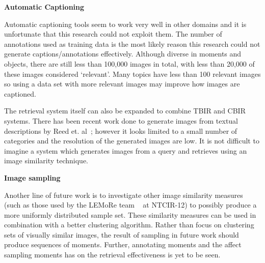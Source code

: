 \textbf{Automatic Captioning}

Automatic captioning tools seem to work very well in other domains and it is unfortunate that this research could not exploit them. The number of annotations used as training data is the most likely reason this research could not generate captions/annotations effectively. Although diverse in moments and objects, there are still less than 100,000 images in total, with less than 20,000 of these images considered `relevant'. Many topics have less than 100 relevant images so using a data set with more relevant images may improve how images are captioned. 

The retrieval system itself can also be expanded to combine TBIR and CBIR systems. There has been recent work done to generate images from textual descriptions by Reed et. al~\cite{reed2016generative}; however it looks limited to a small number of categories and the resolution of the generated images are low. It is not difficult to imagine a system which generates images from a query and retrieves using an image similarity technique.

\textbf{Image sampling}

Another line of future work is to investigate other image similarity measures (such as those used by the LEMoRe team ~\cite{de40lemore} at NTCIR-12) to possibly produce a more uniformly distributed sample set. These similarity measures can be used in combination with a better clustering algorithm. Rather than focus on clustering sets of visually similar images, the result of sampling in future work should produce sequences of moments. Further, annotating moments and the affect sampling moments has on the retrieval effectiveness is yet to be seen.

 
 

